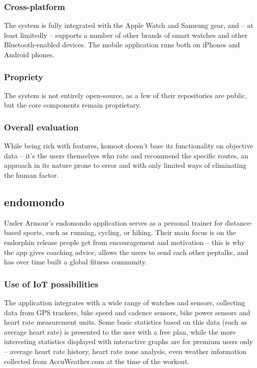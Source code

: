 \subsubsection*{Cross-platform}
The system is fully integrated with the Apple Watch and Samsung gear, and -- at least limitedly -- supports a number of other brands of smart watches and other Bluetooth-enabled devices.
The mobile application runs both on iPhones and Android phones.
\subsubsection*{Propriety}
The system is not entirely open-source, as a few of their repositories are public, but the core components remain proprietary. 

\subsubsection*{Overall evaluation}
While being rich with features, komoot doesn't base its functionality on objective data -- it's the users themselves who rate and recommend the specific routes,
an approach in its nature prone to error and with only limited ways of eliminating the human factor.
\subsection{endomondo}

Under Armour's endomondo application serves as a personal trainer for distance-based sports, such as running, cycling, or hiking.
Their main focus is on the endorphin release people get from encouragement and motivation -- this is why the app gives coaching advice, allows the users to send each other peptalks, and has over time built a global fitness community.
\subsubsection*{Use of IoT possibilities}
The application integrates with a wide range of watches and sensors, collecting data from GPS trackers, bike speed and cadence sensors, bike power sensors and heart rate measurement units.
Some basic statistics based on this data (such as average heart rate) is presented to the user with a free plan, 
while the more interesting statistics displayed with interactive graphs are for premium users only -- average heart rate history, heart rate zone analysis, even weather information collected from AccuWeather.com at the time of the workout.

